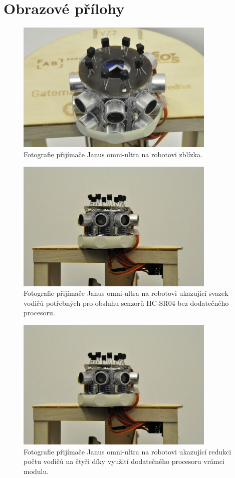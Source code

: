 \chapter{Obrazové přílohy}

\begin{figure}[htbp]
    \centering
    \includegraphics[width=0.85\textwidth]{img/prijimac-1.JPG}
    \caption{Fotografie přijímače Janus omni-ultra na robotovi zblízka.}
    \label{fig:prijimac1}
\end{figure}

\begin{figure}[htbp]
    \centering
    \includegraphics[width=0.85\textwidth]{img/prijimac-2.JPG}
    \caption{Fotografie přijímače Janus omni-ultra na robotovi ukazující svazek vodičů potřebných pro obsluhu senzorů HC-SR04 bez dodatečného procesoru.}
    \label{fig:prijimac2}
\end{figure}

\begin{figure}[htbp]
    \centering
    \includegraphics[width=0.85\textwidth]{img/prijimac-2.JPG}
    \caption{Fotografie přijímače Janus omni-ultra na robotovi ukazující redukci počtu vodičů na čtyři díky využití dodatečného procesoru vrámci modulu.}
    \label{fig:prijimac3}
\end{figure}